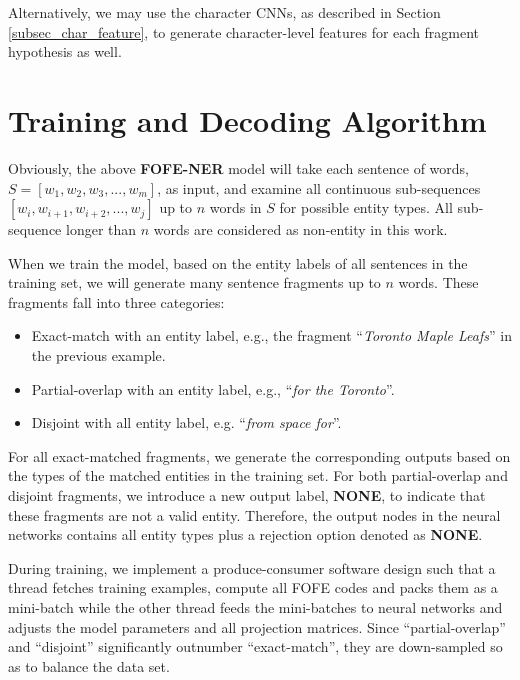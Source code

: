 \documentclass[11pt,a4paper]{article}
\begin{document}
Alternatively, we may use the character CNNs, as described in Section \ref{subsec_char_feature}, to generate character-level features for each fragment hypothesis as well.

\section{Training and Decoding Algorithm}

Obviously, the above \textbf{FOFE-NER} model will take each sentence of words, $S = [w_1, w_2, w_3, ..., w_m]$, as input, and examine all continuous sub-sequences $[w_i, w_{i+1}, w_{i+2}, ..., w_{j}]$ up to $n$ words in $S$ for  possible entity types. All sub-sequence longer than $n$ words are considered as non-entity in this work. 

When we train the model, based on the entity labels of all sentences in the training set, we will generate many sentence fragments up to $n$ words. These fragments fall into three categories:
\begin{itemize}
	\item Exact-match with an entity label, e.g., the fragment  ``{\it Toronto Maple Leafs}'' in the previous example. 
	\item Partial-overlap with an entity label, e.g., ``{\it for the Toronto}''.
	\item Disjoint with all entity label, e.g. ``{\it from space for}''.
\end{itemize}

For all exact-matched fragments, we generate the corresponding outputs based on the types of the matched entities in the training set. For both partial-overlap and disjoint fragments, we introduce a new output label, {\bf NONE}, to indicate that these fragments are not a valid entity. Therefore, the output nodes in the neural networks contains all entity types plus a rejection option denoted as {\bf NONE}.

During training, we implement a produce-consumer software design such that 
a thread fetches training examples, compute all FOFE codes and packs them as a mini-batch while the other thread feeds the mini-batches to neural networks and adjusts the model parameters and all projection matrices. 
Since ``partial-overlap'' and ``disjoint'' significantly outnumber ``exact-match'', they are down-sampled so as to balance the data set. %
\end{document}
